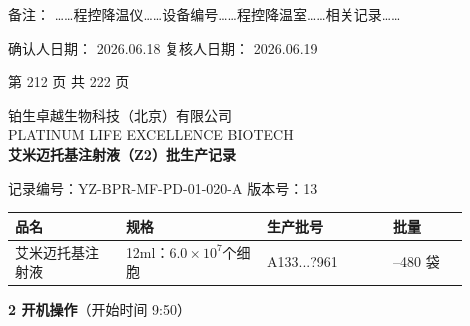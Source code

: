 \documentclass[UTF8,10pt,a4paper,fontset=fandol]{ctexart}
\newcommand{\fieldvalue}[1]{#1}
\newcommand{\handwritten}[1]{#1}
\begin{document}
\noindent
备注：%
\fieldvalue{\handwritten{……程控降温仪……设备编号……程控降温室……相关记录……}}

\noindent
确认人日期：%
\fieldvalue{\handwritten{2026.06.18}}
\hfill
复核人日期：%
\fieldvalue{\handwritten{2026.06.19}}

\begin{center}
第 212 页 共 222 页
\end{center}

\newpage

\begin{center}
{\small 铂生卓越生物科技（北京）有限公司}\\
{\footnotesize PLATINUM LIFE EXCELLENCE BIOTECH}\\[2pt]
{\large \textbf{艾米迈托基注射液（Z2）批生产记录}}
\end{center}

\noindent
记录编号：YZ-BPR-MF-PD-01-020-A \hfill 版本号：13

\begin{center}
\begin{tabular}{|p{0.22\linewidth}|p{0.28\linewidth}|p{0.25\linewidth}|p{0.15\linewidth}|}
\hline
\centering 品名 & \centering 规格 & \centering 生产批号 & \centering 批量\\
\hline
\centering 艾米迈托基注射液 &
\centering 12ml：$6.0\times10^{7}$个细胞 &
\centering
\fieldvalue{\handwritten{A133...?961}} &
\centering 200--480 袋\\
\hline
\end{tabular}
\end{center}

\noindent
\textbf{2 开机操作}（开始时间
\fieldvalue{\handwritten{9:50}}）
\end{document}
